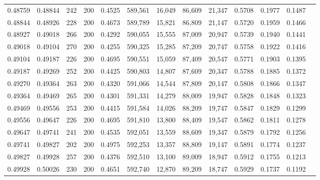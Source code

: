 \begin{tabular}{rrrrrrrrrrrrr}
0.48759 & 0.48844 &    242 & 200 &                                     0.4525 & 589,561 &  16,049 &  86,609 &  21,347 & 0.5708 & 0.1977 & 0.1487 \\
0.48844 & 0.48926 &    228 & 200 &                                     0.4673 & 589,789 &  15,821 &  86,809 &  21,147 & 0.5720 & 0.1959 & 0.1466 \\
0.48927 & 0.49018 &    266 & 200 &                                     0.4292 & 590,055 &  15,555 &  87,009 &  20,947 & 0.5739 & 0.1940 & 0.1441 \\
0.49018 & 0.49104 &    270 & 200 &                                     0.4255 & 590,325 &  15,285 &  87,209 &  20,747 & 0.5758 & 0.1922 & 0.1416 \\
0.49104 & 0.49187 &    226 & 200 &                                     0.4695 & 590,551 &  15,059 &  87,409 &  20,547 & 0.5771 & 0.1903 & 0.1395 \\
0.49187 & 0.49269 &    252 & 200 &                                     0.4425 & 590,803 &  14,807 &  87,609 &  20,347 & 0.5788 & 0.1885 & 0.1372 \\
0.49270 & 0.49364 &    263 & 200 &                                     0.4320 & 591,066 &  14,544 &  87,809 &  20,147 & 0.5808 & 0.1866 & 0.1347 \\
0.49364 & 0.49469 &    265 & 200 &                                     0.4301 & 591,331 &  14,279 &  88,009 &  19,947 & 0.5828 & 0.1848 & 0.1323 \\
0.49469 & 0.49556 &    253 & 200 &                                     0.4415 & 591,584 &  14,026 &  88,209 &  19,747 & 0.5847 & 0.1829 & 0.1299 \\
0.49556 & 0.49647 &    226 & 200 &                                     0.4695 & 591,810 &  13,800 &  88,409 &  19,547 & 0.5862 & 0.1811 & 0.1278 \\
0.49647 & 0.49741 &    241 & 200 &                                     0.4535 & 592,051 &  13,559 &  88,609 &  19,347 & 0.5879 & 0.1792 & 0.1256 \\
0.49741 & 0.49827 &    202 & 200 &                                     0.4975 & 592,253 &  13,357 &  88,809 &  19,147 & 0.5891 & 0.1774 & 0.1237 \\
0.49827 & 0.49928 &    257 & 200 &                                     0.4376 & 592,510 &  13,100 &  89,009 &  18,947 & 0.5912 & 0.1755 & 0.1213 \\
0.49928 & 0.50026 &    230 & 200 &                                     0.4651 & 592,740 &  12,870 &  89,209 &  18,747 & 0.5929 & 0.1737 & 0.1192 \\

\end{tabular}
